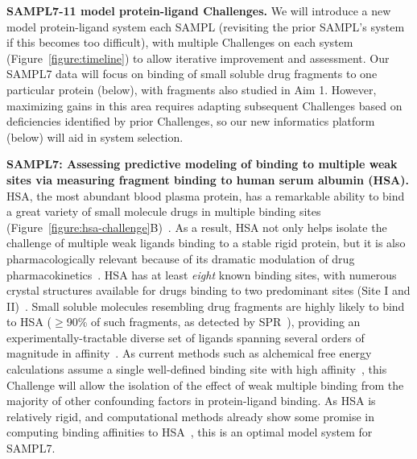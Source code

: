 \documentclass[11pt]{article}
\begin{document}
\textbf{SAMPL7-11 model protein-ligand Challenges.} 
We will introduce a new model protein-ligand system each SAMPL (revisiting the prior SAMPL's system if this becomes too difficult), with multiple Challenges on each system (Figure~\ref{figure:timeline}) to allow iterative improvement and assessment.
Our SAMPL7 data will focus on binding of small soluble drug fragments to one particular protein (below), with fragments also studied in Aim 1. 
However, maximizing gains in this area requires adapting subsequent Challenges based on deficiencies identified by prior Challenges, so our new informatics platform (below) will aid in system selection.

\textbf{SAMPL7: Assessing predictive modeling of binding to multiple weak sites via measuring fragment binding to human serum albumin (HSA).}
HSA, the most abundant blood plasma protein, has a remarkable ability to bind a great variety of small molecule drugs in multiple binding sites (Figure~\ref{figure:hsa-challenge}B)~\cite{Fasano:2005:IUBMBLife(InternationalUnionofBiochemistryandMolecularBiology:Life)}.
As a result, HSA not only helps isolate the challenge of multiple weak ligands binding to a stable rigid protein, but it is also pharmacologically relevant because of its dramatic modulation of drug pharmacokinetics~\cite{Hall:2013:JournalofChemicalInformationandModeling}.
HSA has at least \emph{eight} known binding sites, with numerous crystal structures available for drugs binding to two predominant sites (Site I and II)~\cite{Hall:2013:JournalofChemicalInformationandModeling}.
Small soluble molecules resembling drug fragments are highly likely to bind to HSA ($\ge$90\% of such fragments, as detected by SPR~\cite{Elinder:2011:JournalofBiomolecularScreening}), providing an experimentally-tractable diverse set of ligands spanning several orders of magnitude in affinity~\cite{Elinder:2011:JournalofBiomolecularScreening}.
As current methods such as alchemical free energy calculations assume a single well-defined binding site with high affinity~\cite{Gilson:1997:BiophysicalJournal}, this Challenge will allow the isolation of the effect of weak multiple binding from the majority of other confounding factors in protein-ligand binding.
As HSA is relatively rigid, and computational methods already show some promise in computing binding affinities to HSA~\cite{Hall:2013:JournalofChemicalInformationandModeling,Lexa:2014:PLoSONE,Evoli:2016:Phys.Chem.Chem.Phys.}, this is an optimal model system for SAMPL7.
\end{document}
